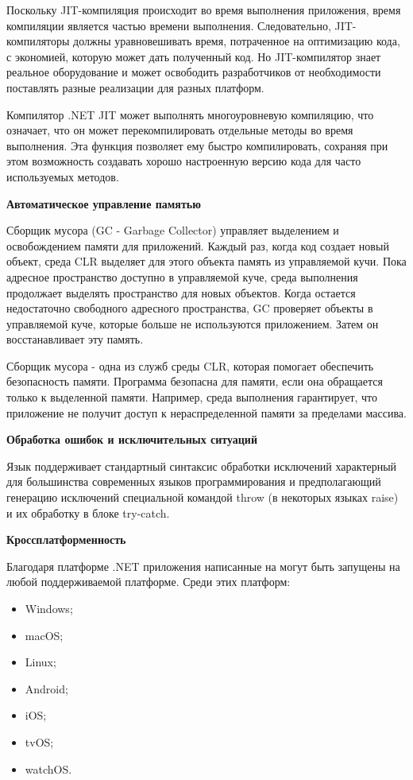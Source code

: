 Поскольку JIT-компиляция происходит во время выполнения приложения, время компиляции является частью времени выполнения. Следовательно, JIT-компиляторы должны уравновешивать время, потраченное на оптимизацию кода, с экономией, которую может дать полученный код. Но JIT-компилятор знает реальное оборудование и может освободить разработчиков от необходимости поставлять разные реализации для разных платформ.

Компилятор .NET JIT может выполнять многоуровневую компиляцию, что означает, что он может перекомпилировать отдельные методы во время выполнения. Эта функция позволяет ему быстро компилировать, сохраняя при этом возможность создавать хорошо настроенную версию кода для часто используемых методов.

\bigskip
\textbf{Автоматическое управление памятью}

Сборщик мусора (GC - Garbage Collector) управляет выделением и освобождением памяти для приложений. Каждый раз, когда код создает новый объект, среда CLR выделяет для этого объекта память из управляемой кучи. Пока адресное пространство доступно в управляемой куче, среда выполнения продолжает выделять пространство для новых объектов. Когда остается недостаточно свободного адресного пространства, GC проверяет объекты в управляемой куче, которые больше не используются приложением. Затем он восстанавливает эту память.

Сборщик мусора - одна из служб среды CLR, которая помогает обеспечить безопасность памяти. Программа безопасна для памяти, если она обращается только к выделенной памяти. Например, среда выполнения гарантирует, что приложение не получит доступ к нераспределенной памяти за пределами массива.

\bigskip
\textbf{Обработка ошибок и исключительных ситуаций}

Язык \csharp поддерживает стандартный синтаксис обработки исключений характерный для большинства современных языков программирования и предполагающий генерацию исключений специальной командой throw (в некоторых языках raise) и их обработку в блоке try-catch.

\newpage
\textbf{Кроссплатформенность}

Благодаря платформе .NET приложения написанные на \csharp могут быть запущены на любой поддерживаемой платформе. Среди этих платформ:
\begin{itemize}
    \item Windows;
    \item macOS;
    \item Linux;
    \item Android;
    \item iOS;
    \item tvOS;
    \item watchOS.
\end{itemize}

